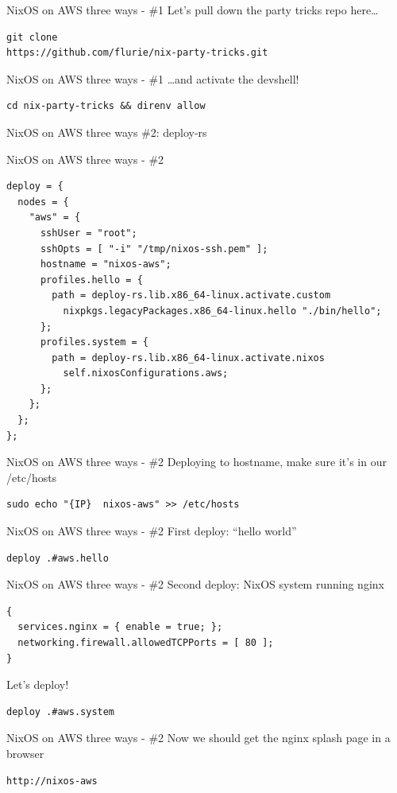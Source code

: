 \documentclass[bigger]{beamer}
\begin{document}
\begin{frame}[label={sec:org1d247c2},fragile]{NixOS on AWS three ways - \#1}
 Let's pull down the party tricks repo here\ldots{}
\begin{verbatim}
git clone
https://github.com/flurie/nix-party-tricks.git
\end{verbatim}
\end{frame}
\begin{frame}[label={sec:org8af2c8d},fragile]{NixOS on AWS three ways - \#1}
 \ldots{}and activate the devshell!
\begin{verbatim}
cd nix-party-tricks && direnv allow
\end{verbatim}
\end{frame}
\begin{frame}[label={sec:orgc1e45f0}]{NixOS on AWS three ways}
\#2: deploy-rs
\end{frame}
\begin{frame}[label={sec:orgb815bfe},fragile]{NixOS on AWS three ways - \#2}
 \tiny
\begin{verbatim}
deploy = {
  nodes = {
    "aws" = {
      sshUser = "root";
      sshOpts = [ "-i" "/tmp/nixos-ssh.pem" ];
      hostname = "nixos-aws";
      profiles.hello = {
        path = deploy-rs.lib.x86_64-linux.activate.custom
          nixpkgs.legacyPackages.x86_64-linux.hello "./bin/hello";
      };
      profiles.system = {
        path = deploy-rs.lib.x86_64-linux.activate.nixos
          self.nixosConfigurations.aws;
      };
    };
  };
};
\end{verbatim}
\end{frame}
\begin{frame}[label={sec:orgfefcf4c},fragile]{NixOS on AWS three ways - \#2}
 Deploying to hostname, make sure it's in our /etc/hosts
\begin{verbatim}
sudo echo "{IP}  nixos-aws" >> /etc/hosts
\end{verbatim}
\end{frame}
\begin{frame}[label={sec:org6de3be6},fragile]{NixOS on AWS three ways - \#2}
 First deploy: ``hello world''
\begin{verbatim}
deploy .#aws.hello
\end{verbatim}
\end{frame}
\begin{frame}[label={sec:org53f8847},fragile]{NixOS on AWS three ways - \#2}
 Second deploy: NixOS system running nginx
\begin{verbatim}
{
  services.nginx = { enable = true; };
  networking.firewall.allowedTCPPorts = [ 80 ];
}
\end{verbatim}
Let's deploy!
\begin{verbatim}
deploy .#aws.system
\end{verbatim}
\end{frame}
\begin{frame}[label={sec:orgd162f06},fragile]{NixOS on AWS three ways - \#2}
 Now we should get the nginx splash page in a browser
\begin{verbatim}
http://nixos-aws
\end{verbatim}
\end{frame}
\end{document}
